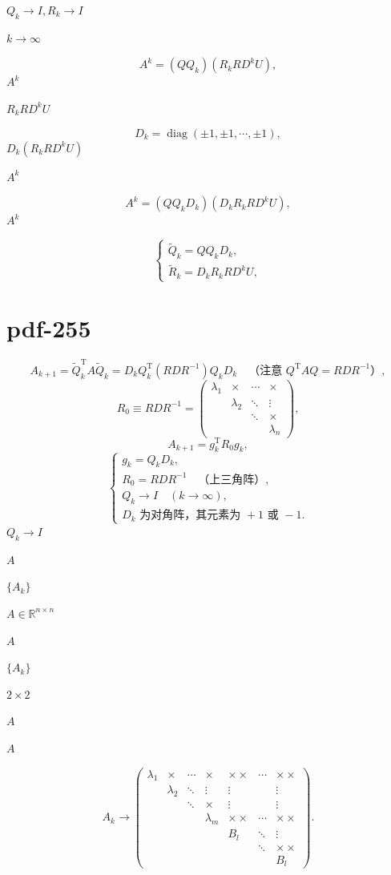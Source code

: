 \documentclass[UTF8,fontset=fandol]{ctexart}
\begin{document}
$Q_k\to I,R_k\to I$\par
$k\to\infty$\par
\[
A^k=(QQ_k)(R_kRD^kU),
\tag{9.4.16}
\]
$A^k$\par
$R_kRD^kU$\par
\[
D_k=\operatorname{diag}(\pm1,\pm1,\cdots,\pm1),
\]
$D_k(R_kRD^kU)$\par
$A^k$\par
\[
A^k=(QQ_kD_k)(D_kR_kRD^kU),
\]
$A^k$\par
\[
\begin{cases}
\widetilde Q_k=QQ_kD_k,\\
\widetilde R_k=D_kR_kRD^kU,
\end{cases}
\tag{9.4.17}
\]
\clearpage
\section*{pdf-255}
\[
A_{k+1}=\widetilde Q_k^{\mathrm T}A\widetilde Q_k
=D_kQ_k^{\mathrm T}(RDR^{-1})Q_kD_k
\quad\text{（注意 }Q^{\mathrm T}AQ=RDR^{-1}\text{）},
\]
\[
R_0\equiv RDR^{-1}=\begin{pmatrix}
\lambda_1&\times&\cdots&\times\\
&\lambda_2&\ddots&\vdots\\
&&\ddots&\times\\
&&&\lambda_n
\end{pmatrix},
\]
\[
A_{k+1}=g_k^{\mathrm T}R_0g_k,
\]
\[
\begin{cases}
g_k=Q_kD_k,\\
R_0=RDR^{-1}\quad\text{（上三角阵）},\\
Q_k\to I\quad(k\to\infty),\\
D_k\text{ 为对角阵，其元素为 }+1\text{ 或 }-1.
\end{cases}
\]
$Q_k\to I$\par
$A$\par
$\{A_k\}$\par
$A\in\mathbb R^{n\times n}$\par
$A$\par
$\{A_k\}$\par
$2\times2$\par
$A$\par
$A$\par
\[
A_k\to\begin{pmatrix}
\lambda_1&\times&\cdots&\times&\times\times&\cdots&\times\times\\
&\lambda_2&\ddots&\vdots&\vdots&&\vdots\\
&&\ddots&\times&\vdots&&\vdots\\
&&&\lambda_m&\times\times&\cdots&\times\times\\
&&&&B_l&\ddots&\vdots\\
&&&&&\ddots&\times\times\\
&&&&&&B_l
\end{pmatrix}.
\]
\end{document}
